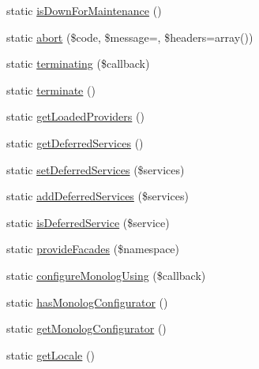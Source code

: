 \begin{DoxyCompactItemize}
static \mbox{\hyperlink{class_illuminate_1_1_support_1_1_facades_1_1_app_ab5121c618705672d1cb2e049705da6d4}{is\+Down\+For\+Maintenance}} ()
\item 
static \mbox{\hyperlink{class_illuminate_1_1_support_1_1_facades_1_1_app_a75aaa57ba29807d1e66c4819b33e4efb}{abort}} (\$code, \$message=\textquotesingle{}\textquotesingle{}, \$headers=array())
\item 
static \mbox{\hyperlink{class_illuminate_1_1_support_1_1_facades_1_1_app_aaa82ebd6ba2bf6af580669b2a15b1196}{terminating}} (\$callback)
\item 
static \mbox{\hyperlink{class_illuminate_1_1_support_1_1_facades_1_1_app_a982768aceae29a845b008c99edd5e03b}{terminate}} ()
\item 
static \mbox{\hyperlink{class_illuminate_1_1_support_1_1_facades_1_1_app_aad297b9ed28f650dae1721e05df5d997}{get\+Loaded\+Providers}} ()
\item 
static \mbox{\hyperlink{class_illuminate_1_1_support_1_1_facades_1_1_app_a8898e3fcdc4d57c73ca8dd9c3eeb27b6}{get\+Deferred\+Services}} ()
\item 
static \mbox{\hyperlink{class_illuminate_1_1_support_1_1_facades_1_1_app_ac74a1a0bfe5c595e1714f344bbc3c410}{set\+Deferred\+Services}} (\$services)
\item 
static \mbox{\hyperlink{class_illuminate_1_1_support_1_1_facades_1_1_app_af63352b358d10632ec6537aacf2b0933}{add\+Deferred\+Services}} (\$services)
\item 
static \mbox{\hyperlink{class_illuminate_1_1_support_1_1_facades_1_1_app_a9e6bba2ff3db437fd8af4f59225c1601}{is\+Deferred\+Service}} (\$service)
\item 
static \mbox{\hyperlink{class_illuminate_1_1_support_1_1_facades_1_1_app_acb93eb8d4d24729b8264c00e5b94dfb1}{provide\+Facades}} (\$namespace)
\item 
static \mbox{\hyperlink{class_illuminate_1_1_support_1_1_facades_1_1_app_aeba7c2058e2b423b7f5ed5a49e69c669}{configure\+Monolog\+Using}} (\$callback)
\item 
static \mbox{\hyperlink{class_illuminate_1_1_support_1_1_facades_1_1_app_aab82809a204086b615e445bea282d58b}{has\+Monolog\+Configurator}} ()
\item 
static \mbox{\hyperlink{class_illuminate_1_1_support_1_1_facades_1_1_app_a10d6104d2082582c9b60e90a344bb02e}{get\+Monolog\+Configurator}} ()
\item 
static \mbox{\hyperlink{class_illuminate_1_1_support_1_1_facades_1_1_app_a7c40fc2b0fa689f7731b77dc910ee1b3}{get\+Locale}} ()

\end{DoxyCompactItemize}
